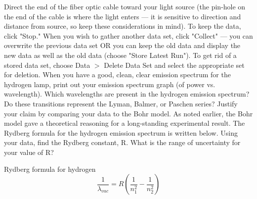 Direct the end of the fiber optic cable toward your light source (the pin-hole on the end of the cable is where the light enters — it is sensitive to direction and distance from source, so keep these considerations in mind). 
To keep the data, click "Stop." 
When you wish to gather another data set, click "Collect" — you can overwrite the previous data set OR you can keep the old data and display the new data as well as the old data (choose "Store Latest Run"). 
To get rid of a stored data set, choose Data $>$ Delete Data Set and select the appropriate set for deletion. 
When you have a good, clean, clear emission spectrum for the hydrogen lamp, print out your emission spectrum graph (of power vs. wavelength).
Which wavelengths are present in the hydrogen emission spectrum? 
Do these transitions represent the Lyman, Balmer, or Paschen series? 
Justify your claim by comparing your data to the Bohr model. 
As noted earlier, the Bohr model gave a theoretical reasoning for a long-standing experimental result. 
The Rydberg formula for the hydrogen emission spectrum is written below. 
Using your data, find the Rydberg constant, R. 
What is the range of uncertainty for your value of R?
\par
Rydberg formula for hydrogen
\[ \frac{1}{\lambda_{vac}} = R \left( \frac{1}{n_{1}^{2}} - \frac{1}{n_{2}^{2}} \right) \]

